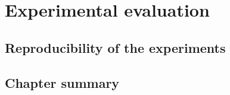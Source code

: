 \chapter{Experimental evaluation}\label{chapter:experimental_evaluation}

\section{Reproducibility of the experiments}
\label{sec:reproducibility}

\section{Chapter summary}
